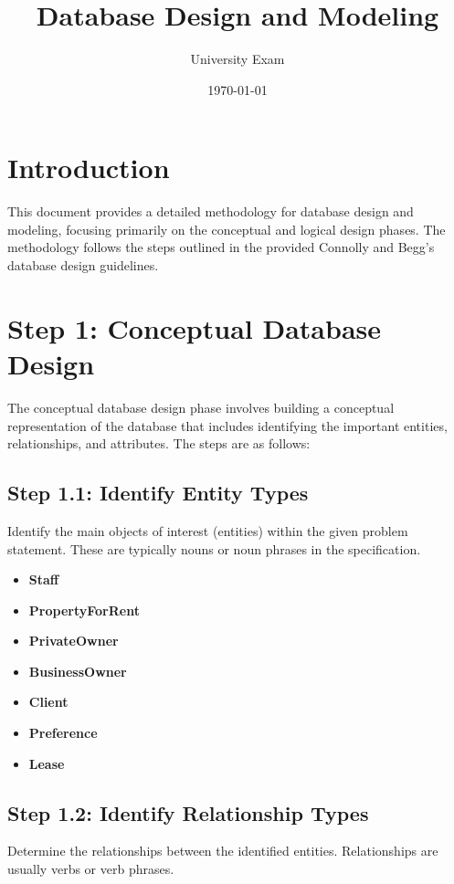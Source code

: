 \documentclass[a4paper,12pt]{article}
\title{Database Design and Modeling}
\author{University Exam}
\date{\today}
\begin{document}
\maketitle

\section*{Introduction}

This document provides a detailed methodology for database design and modeling, focusing primarily on the conceptual and logical design phases. The methodology follows the steps outlined in the provided Connolly and Begg's database design guidelines.

\section*{Step 1: Conceptual Database Design}

The conceptual database design phase involves building a conceptual representation of the database that includes identifying the important entities, relationships, and attributes. The steps are as follows:

\subsection*{Step 1.1: Identify Entity Types}
Identify the main objects of interest (entities) within the given problem statement. These are typically nouns or noun phrases in the specification.

\begin{itemize}
    \item \textbf{Staff}
    \item \textbf{PropertyForRent}
    \item \textbf{PrivateOwner}
    \item \textbf{BusinessOwner}
    \item \textbf{Client}
    \item \textbf{Preference}
    \item \textbf{Lease}
\end{itemize}

\subsection*{Step 1.2: Identify Relationship Types}
Determine the relationships between the identified entities. Relationships are usually verbs or verb phrases.
\end{document}
